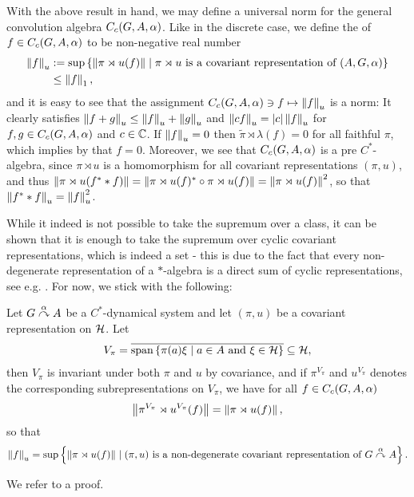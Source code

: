 With the above result in hand, we may define a universal norm for the general convolution algebra $C_c(G,A,\alpha)$. Like in the discrete case, we define the  of $f \in C_c(G,A,\alpha)$ to be non-negative real number
\begin{align*}
\left\lVert f \right\rVert_u &:= \sup\left\{ \left\lVert \pi \rtimes u (f)\right\rVert \mid  \pi \rtimes u \text{ is a covariant representation of }(A,G ,\alpha) \right\}\\
&\leq \left\lVert f \right\rVert_1,
\end{align*}
and it is easy to see that the assignment $C_c(G,A,\alpha) \ni f \mapsto \left\lVert f \right\rVert_u$ is a norm: It clearly satisfies $\left\lVert f + g \right\rVert_u \leq \left\lVert f \right\rVert_u + \left\lVert g \right\rVert_u$ and $\left\lVert cf \right\rVert_u = |c| \left\lVert f \right\rVert_u$ for $f,g \in C_c(G,A,\alpha)$ and $c \in \mathbb{C}$. If $\left\lVert f \right\rVert_u = 0$ then $\tilde{\pi} \rtimes \lambda (f) = 0$ for all faithful $\pi$, which implies by  that $f = 0$. Moreover, we see that $C_c(G,A,\alpha)$ is a pre $C^*$-algebra, since $\pi \rtimes u$ is a homomorphism for all covariant representations $(\pi,u)$, and thus $\left\lVert \pi \rtimes u (f^*\ast f)\right\rVert = \left\lVert \pi \rtimes u(f)^* \circ \pi \rtimes u(f)\right\rVert = \left\lVert \pi \rtimes u (f)\right\rVert^2$, so that $\left\lVert f^* \ast f\right\rVert_u = \left\lVert f \right\rVert_u^2$. 
\begin{note}
While it indeed is not possible to take the supremum over a class, it can be shown that it is enough to take the supremum over cyclic covariant representations, which is indeed a set - this is due to the fact that every non-degenerate representation of a $*$-algebra is a direct sum of cyclic representations, see e.g. \cite[Theorem 5.1.3]{murphy2014c}. For now, we stick with the following:
\end{note}
\begin{lemma}
Let $G \stackrel{\alpha}{\curvearrowright} A$ be a $C^*$-dynamical system and let $(\pi,u)$ be a covariant representation on $\mathcal{H}$. Let 
\begin{align*}
	V_\pi = \overline {\mathrm{span}\left\{ \pi(a) \xi \mid a \in A \text{ and } \xi \in \mathcal{H} \right\}} \subseteq \mathcal{H},
\end{align*}
then $V_\pi$ is invariant under both $\pi$ and $u$ by covariance, and if $\pi^{V_\pi}$ and $ u^{V_\pi}$ denotes the corresponding subrepresentations on $V_{\pi}$, we have for all $f \in C_c(G,A,\alpha)$ 
\begin{align*}
	\left\lVert \pi ^{V_\pi} \rtimes u^{V_\pi}(f) \right\rVert = \left\lVert \pi \rtimes u (f) \right\rVert,
\end{align*}
so that
\begin{align*}
	\left\lVert f \right\rVert_u = \sup\left\{ \left\lVert \pi \rtimes u(f) \right\rVert \mid  (\pi,u) \text{ is a non-degenerate covariant representation of } G \stackrel{\alpha}{\curvearrowright} A\right\}.
\end{align*}
\label{cross:essnorm}
\end{lemma}
We refer to \cite[52]{williamscrossed} a proof.

